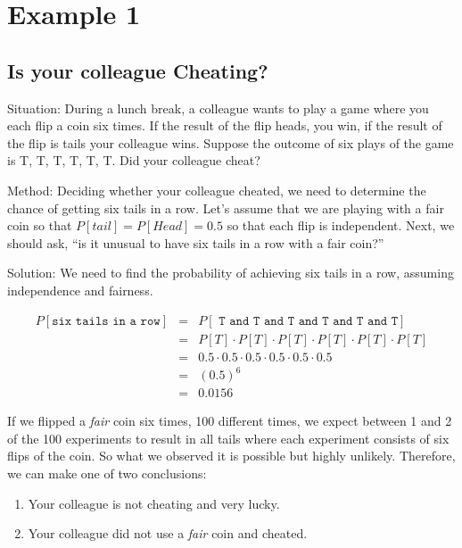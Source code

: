 \documentclass[11pt]{book}\usepackage[]{graphicx}\usepackage[]{color}
\begin{document}
\section{Example 1}

\subsection{Is your colleague Cheating?}

Situation: During a lunch break, a colleague wants to play a game where you each flip a coin six times.  If the result of the flip heads, you win, if the result of the flip is tails your colleague wins.  Suppose the outcome of six plays of the game is T, T, T, T, T, T.  Did your colleague cheat?

Method: Deciding whether your colleague cheated, we need to determine the chance of getting six tails in a row. Let's assume that we are playing with a fair coin so that $P[tail] = P[Head] = 0.5$ so that each flip is independent.  Next, we should ask, ``is it unusual to have six tails in a row with a fair coin?''


Solution: We need to find the probability of achieving six tails in a row, assuming independence and fairness.

\newpage


\begin{eqnarray*}
P[\texttt{six tails in a row}] &=& P[\texttt{ T and T and T and T and T and T} ] \\
&=& P[T] \cdot P[T] \cdot P[T] \cdot P[T] \cdot P[T] \cdot P[T] \\
&=& 0.5 \cdot 0.5 \cdot 0.5 \cdot 0.5 \cdot 0.5 \cdot 0.5 \\
&=& (0.5)^6 \\
&=& 0.0156
\end{eqnarray*}


If we flipped a \textit{fair} coin six times, 100 different times, we expect between 1 and 2 of the 100 experiments to result in all tails where each experiment consists of six flips of the coin.  So what we observed it is possible but highly unlikely.  Therefore, we can make one of two conclusions:

\begin{enumerate}
\item Your colleague is not cheating and very lucky.
\item Your colleague did not use a \textit{fair} coin and cheated.
\end{enumerate}
\end{document}
